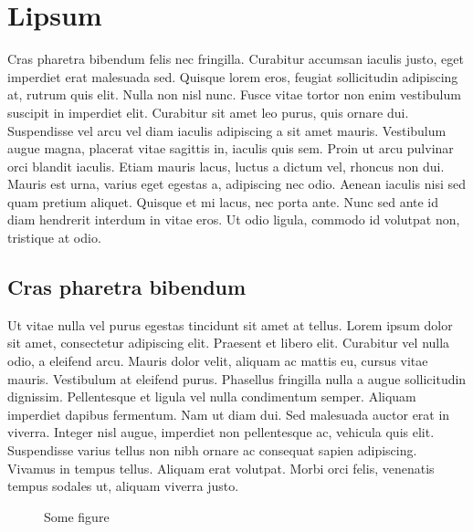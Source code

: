 \chapter{Lipsum}
\label{section:lipsum}

Cras pharetra bibendum felis nec fringilla. Curabitur accumsan iaculis justo,
eget imperdiet erat malesuada sed. Quisque lorem eros, feugiat sollicitudin
adipiscing at, rutrum quis elit. Nulla non nisl nunc. Fusce vitae tortor non
enim vestibulum suscipit in imperdiet elit. Curabitur sit amet leo purus, quis
ornare dui. Suspendisse vel arcu vel diam iaculis adipiscing a sit amet mauris.
Vestibulum augue magna, placerat vitae sagittis in, iaculis quis sem. Proin ut
arcu pulvinar orci blandit iaculis. Etiam mauris lacus, luctus a dictum vel,
rhoncus non dui. Mauris est urna, varius eget egestas a, adipiscing nec odio.
Aenean iaculis nisi sed quam pretium aliquet. Quisque et mi lacus, nec porta
ante. Nunc sed ante id diam hendrerit interdum in vitae eros. Ut odio ligula,
commodo id volutpat non, tristique at odio.

\section{Cras pharetra bibendum}
\label{section:lipsum:cras}

Ut vitae nulla vel purus egestas tincidunt sit amet at tellus. Lorem ipsum dolor
sit amet, consectetur adipiscing elit. Praesent et libero elit. Curabitur vel
nulla odio, a eleifend arcu. Mauris dolor velit, aliquam ac mattis eu, cursus
vitae mauris. Vestibulum at eleifend purus. Phasellus fringilla nulla a augue
sollicitudin dignissim. Pellentesque et ligula vel nulla condimentum semper.
Aliquam imperdiet dapibus fermentum. Nam ut diam dui. Sed malesuada auctor erat
in viverra. Integer nisl augue, imperdiet non pellentesque ac, vehicula quis
elit. Suspendisse varius tellus non nibh ornare ac consequat sapien adipiscing.
Vivamus in tempus tellus. Aliquam erat volutpat. Morbi orci felis, venenatis
tempus sodales ut, aliquam viverra justo.~\cite{conference:06,Doe:2010}

\begin{figure}[ht]
	\centering
	\subfloat[Something]{
		\resizebox{0.45\linewidth}{!}{
			\label{figure:some1}
			
		}
	}
	\hfill
	\caption{Some figure}
	\label{figure:some}
\end{figure}


